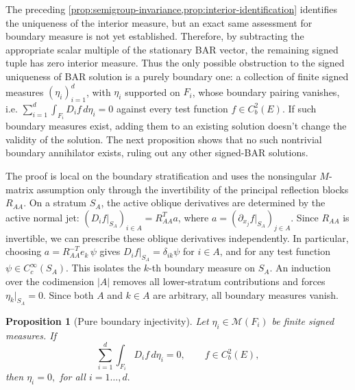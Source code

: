 \documentclass[aihp]{imsart}
\numberwithin{equation}{section}
\theoremstyle{plain}
\newtheorem{proposition}[proposition]{Proposition}
\theoremstyle{definition}
\newcommand{\cM}{\mathcal M}
\newcommand{\1}{\mathbf 1}
\begin{document}
The preceding \cref{prop:semigroup-invariance,prop:interior-identification} identifies the uniqueness of the interior measure, but an exact same assessment for boundary measure is not yet established.
Therefore, by subtracting the appropriate scalar multiple of the stationary BAR vector, the
remaining signed tuple has zero interior measure. Thus the only possible
obstruction to the signed uniqueness of BAR solution is a purely boundary one: a collection of
finite signed measures \((\eta_i)_{i=1}^d\), with \(\eta_i\) supported on \(F_i\),
whose boundary pairing vanishes, i.e. $\sum_{i=1}^d \int_{F_i} D_i f\,d\eta_i=0$ against every test function $f\in C_b^2(E)$. If such boundary measures exist, adding them to an existing solution doesn't change the validity of the solution.
The next proposition shows that no such nontrivial boundary annihilator exists, ruling out any other signed-BAR solutions.

The proof is local on the boundary stratification and uses the nonsingular
\(M\)-matrix assumption only through the invertibility of the principal
reflection blocks \(R_{AA}\). On a stratum \(S_A\), the active oblique derivatives
are determined by the active normal jet:
   $(D_i f|_{S_A})_{i\in A}=R_{AA}^T a$, where
   $a=(\partial_{x_j}f|_{S_A})_{j\in A}$.
Since \(R_{AA}\) is invertible, we can prescribe these oblique derivatives
independently. In particular, choosing
   $a=R_{AA}^{-T}e_k\,\psi$
gives
   $D_i f|_{S_A}=\delta_{ik}\psi$ for $i\in A$, and
for any test function \(\psi\in C_c^\infty(S_A)\). This isolates the \(k\)-th boundary
measure on \(S_A\). An induction over the codimension \(|A|\) removes all
lower-stratum contributions and forces \(\eta_k|_{S_A}=0\). Since both \(A\)
and \(k\in A\) are arbitrary, all boundary measures vanish.


\begin{proposition}[Pure boundary injectivity]\label{prop:pure-boundary}
Let $\eta_i\in\cM(F_i)$ be finite signed measures. If
\begin{equation}\label{eq:pure-boundary}
 \sum_{i=1}^d\int_{F_i}D_i f\,d\eta_i=0,
 \qquad f\in C_b^2(E),
\end{equation}
then $\eta_i=0,$ for all $i=1\ldots,d.$
\end{proposition}
\end{document}
